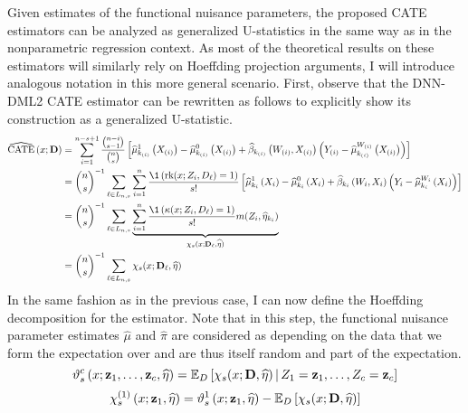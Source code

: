 Given estimates of the functional nuisance parameters, the proposed CATE estimators can be analyzed as generalized U-statistics in the same way as in the nonparametric regression context.
As most of the theoretical results on these estimators will similarly rely on Hoeffding projection arguments, I will introduce analogous notation in this more general scenario.
First, observe that the DNN-DML2 CATE estimator can be rewritten as follows to explicitly show its construction as a generalized U-statistic.
\begin{equation}
    \begin{aligned}
        \widehat{\operatorname{CATE}}\left(x; \mathbf{D}\right) 
        & = \sum_{i = 1}^{n - s + 1} \frac{\binom{n-i}{s-1}}{\binom{n}{s}}
		\left[\hat{\mu}_{k_{(i)}}^{1}\left(X_{(i)}\right) - \hat{\mu}_{k_{(i)}}^{0}\left(X_{(i)}\right) + \hat{\beta}_{k_{(i)}}\left(W_{(i)}, X_{(i)}\right)\left(Y_{(i)} - \hat{\mu}^{W_{(i)}}_{k_{(i)}}\left(X_{(i)}\right)\right)\right] \\
        & = \binom{n}{s}^{-1} \sum_{\ell \in L_{n,s}}
        \sum_{i = 1}^{n}\frac{\1\left(\rk(x; Z_{i}, D_{\ell}) = 1\right)}{s!} 
        \left[\hat{\mu}_{k_i}^{1}\left(X_{i}\right) - \hat{\mu}_{k_i}^{0}\left(X_{i}\right) + \hat{\beta}_{k_i}\left(W_{i}, X_{i}\right)\left(Y_{i} - \hat{\mu}^{W_{i}}_{k_i}\left(X_{i}\right)\right)\right] \\
        & = \binom{n}{s}^{-1} \sum_{\ell \in L_{n,s}}
        \underbrace{\sum_{i = 1}^{n}\frac{\1\left(\kappa(x; Z_{i}, D_{\ell}) = 1\right)}{s!} 
        m(Z_{i}, \hat{\eta}_{k_i})}_{\chi_{s}(x; \mathbf{D}_{\ell}, \hat{\eta})} \\
        & = \binom{n}{s}^{-1} \sum_{\ell \in L_{n,s}}\chi_{s}(x; \mathbf{D}_{\ell}, \hat{\eta})
    \end{aligned}
\end{equation}
In the same fashion as in the previous case, I can now define the Hoeffding decomposition for the estimator.
Note that in this step, the functional nuisance parameter estimates $\hat{\mu}$ and $\hat{\pi}$ are considered as depending on the data that we form the expectation over and are thus itself random and part of the expectation.
\begin{equation}
    \vartheta_{s}^{c}\left(x; \mathbf{z}_{1}, \dotsc, \mathbf{z}_{c}, \widehat{\eta}\right)
    = \mathbb{E}_{D}\left[\chi_{s}(x; \mathbf{D}, \widehat{\eta}) \, \middle| \, Z_1 = \mathbf{z}_1, \dotsc, Z_c = \mathbf{z}_c\right]
\end{equation}
\begin{equation}
    \chi_{s}^{(1)}\left(x; \mathbf{z}_{1}, \widehat{\eta}\right)
	= \vartheta_{s}^{1}\left(x; \mathbf{z}_{1}, \widehat{\eta}\right)
    - \mathbb{E}_{D}\left[\chi_{s}(x; \mathbf{D}, \widehat{\eta})\right]
\end{equation}
